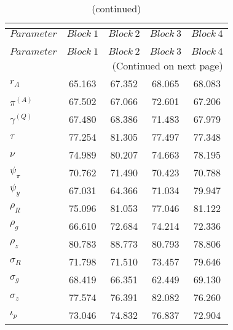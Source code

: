  
\begin{center}
\begin{longtable}{lcccc} 
\caption{MCMC Inefficiency factors per block}\\
 \label{Table:MCMC_inefficiency_factors}\\
\toprule 
$Parameter         $	 & 	 $     Block~1$	 & 	 $     Block~2$	 & 	 $     Block~3$	 & 	 $     Block~4$\\
\midrule \endfirsthead 
\caption{(continued)}\\
 \toprule \\ 
$Parameter         $	 & 	 $     Block~1$	 & 	 $     Block~2$	 & 	 $     Block~3$	 & 	 $     Block~4$\\
\midrule \endhead 
\midrule \multicolumn{5}{r}{(Continued on next page)} \\ \bottomrule \endfoot 
\bottomrule \endlastfoot 
$ {r_{A}}          $	 & 	      65.163	 & 	      67.352	 & 	      68.065	 & 	      68.083 \\ 
$ {\pi^{(A)}}      $	 & 	      67.502	 & 	      67.066	 & 	      72.601	 & 	      67.206 \\ 
$ {\gamma^{(Q)}}   $	 & 	      67.480	 & 	      68.386	 & 	      71.483	 & 	      67.979 \\ 
$ {\tau}           $	 & 	      77.254	 & 	      81.305	 & 	      77.497	 & 	      77.348 \\ 
$ {\nu}            $	 & 	      74.989	 & 	      80.207	 & 	      74.663	 & 	      78.195 \\ 
$ {\psi_\pi}       $	 & 	      70.762	 & 	      71.490	 & 	      70.423	 & 	      70.788 \\ 
$ {\psi_y}         $	 & 	      67.031	 & 	      64.366	 & 	      71.034	 & 	      79.947 \\ 
$ {\rho_R}         $	 & 	      75.096	 & 	      81.053	 & 	      77.046	 & 	      81.122 \\ 
$ {\rho_{g}}       $	 & 	      66.610	 & 	      72.684	 & 	      74.214	 & 	      72.336 \\ 
$ {\rho_z}         $	 & 	      80.783	 & 	      88.773	 & 	      80.793	 & 	      78.806 \\ 
$ {\sigma_R}       $	 & 	      71.798	 & 	      71.510	 & 	      73.457	 & 	      79.646 \\ 
$ {\sigma_{g}}     $	 & 	      68.419	 & 	      66.351	 & 	      62.449	 & 	      69.130 \\ 
$ {\sigma_z}       $	 & 	      77.574	 & 	      76.391	 & 	      82.082	 & 	      76.260 \\ 
$ {\iota_p}        $	 & 	      73.046	 & 	      74.832	 & 	      76.837	 & 	      72.904 \\ 
\end{longtable}
 \end{center}
